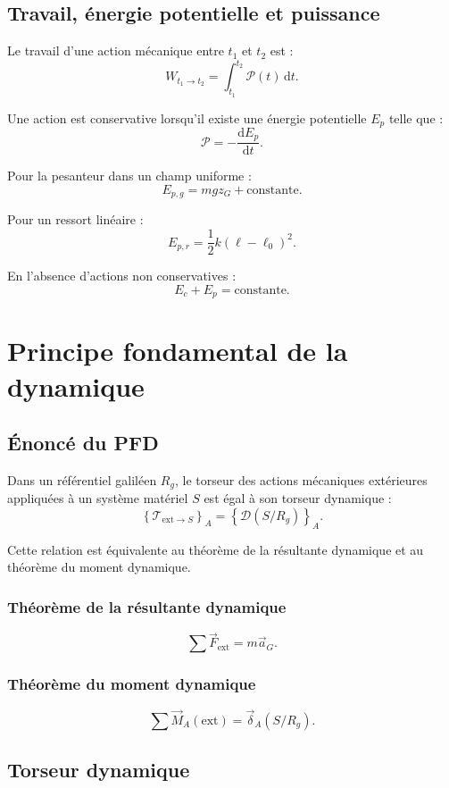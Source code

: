 \subsection{Travail, énergie potentielle et puissance}

Le travail d'une action mécanique entre $t_1$ et $t_2$ est :
\[
W_{t_1\rightarrow t_2}=\int_{t_1}^{t_2}\mathcal P(t)\,\mathrm dt.
\]

Une action est conservative lorsqu'il existe une énergie potentielle $E_p$ telle que :
\[
\mathcal P=-\frac{\mathrm d E_p}{\mathrm dt}.
\]

Pour la pesanteur dans un champ uniforme :
\[
E_{p,g}=mgz_G+\text{constante}.
\]

Pour un ressort linéaire :
\[
E_{p,r}=\frac12 k(\ell-\ell_0)^2.
\]

En l'absence d'actions non conservatives :
\[
E_c+E_p=\text{constante}.
\]

\section{Principe fondamental de la dynamique}

\subsection{Énoncé du PFD}

Dans un référentiel galiléen $R_g$, le torseur des actions mécaniques extérieures appliquées à un système matériel $S$ est égal à son torseur dynamique :
\[
\left\{\mathcal T_{\mathrm{ext}\rightarrow S}\right\}_A
=\left\{\mathcal D(S/R_g)\right\}_A.
\]

Cette relation est équivalente au théorème de la résultante dynamique et au théorème du moment dynamique.

\subsubsection{Théorème de la résultante dynamique}
\[
\sum\vec F_{\mathrm{ext}}=m\vec a_G.
\]

\subsubsection{Théorème du moment dynamique}
\[
\sum\vec M_A(\mathrm{ext})=\vec\delta_A(S/R_g).
\]

\subsection{Torseur dynamique}

